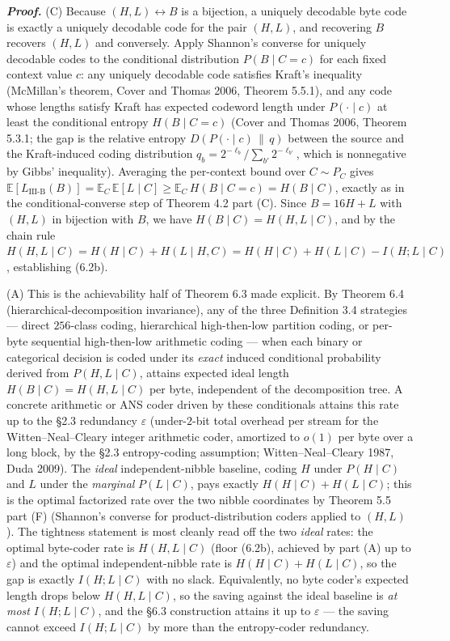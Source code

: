 \documentclass[
]{article}
\begin{document}
\emph{\textbf{Proof.}} (C) Because $(H, L) \leftrightarrow B$ is a
bijection, a uniquely decodable byte code is exactly a uniquely
decodable code for the pair $(H, L)$, and recovering $B$ recovers
$(H, L)$ and conversely. Apply Shannon's converse for uniquely
decodable codes to the conditional distribution $P(B \mid C = c)$ for
each fixed context value $c$: any uniquely decodable code satisfies
Kraft's inequality (McMillan's theorem, Cover and Thomas 2006,
Theorem 5.5.1), and any code whose lengths satisfy Kraft has expected
codeword length under $P(\cdot \mid c)$ at least the conditional
entropy $H(B \mid C = c)$ (Cover and Thomas 2006, Theorem 5.3.1; the
gap is the relative entropy $D(P(\cdot \mid c) \,\|\, q)$ between the
source and the Kraft-induced coding distribution
$q_b = 2^{-\ell_b} / \sum_{b'} 2^{-\ell_{b'}}$, which is nonnegative
by Gibbs' inequality). Averaging the per-context bound
over $C \sim P_C$ gives
$\mathbb{E}[L_{\mathrm{III\text{-}B}}(B)] = \mathbb{E}_C
\,\mathbb{E}[L \mid C] \geq \mathbb{E}_C\, H(B \mid C = c) = H(B \mid C)$,
exactly as in the conditional-converse step of Theorem 4.2 part (C).
Since $B = 16H + L$ with $(H, L)$ in bijection with $B$, we have
$H(B \mid C) = H(H, L \mid C)$, and by the chain rule
$H(H, L \mid C) = H(H \mid C) + H(L \mid H, C)
= H(H \mid C) + H(L \mid C) - I(H ; L \mid C)$, establishing (6.2b).

(A) This is the achievability half of Theorem 6.3 made explicit. By
Theorem 6.4 (hierarchical-decomposition invariance), any of the three
Definition 3.4 strategies --- direct $256$-class coding, hierarchical
high-then-low partition coding, or per-byte sequential high-then-low
arithmetic coding --- when each binary or categorical decision is
coded under its \emph{exact} induced conditional probability derived
from $P(H, L \mid C)$, attains expected ideal length
$H(B \mid C) = H(H, L \mid C)$ per byte, independent of the
decomposition tree. A concrete arithmetic or ANS coder driven by
these conditionals attains this rate up to the §2.3 redundancy
$\varepsilon$ (under-$2$-bit total overhead per stream for the
Witten--Neal--Cleary integer arithmetic coder, amortized to $o(1)$
per byte over a long block, by the §2.3 entropy-coding assumption;
Witten--Neal--Cleary 1987, Duda 2009). The \emph{ideal} independent-nibble
baseline, coding $H$ under $P(H \mid C)$ and $L$ under the
\emph{marginal} $P(L \mid C)$, pays exactly $H(H \mid C) + H(L \mid C)$;
this is the optimal factorized rate over the two nibble coordinates by
Theorem 5.5 part (F) (Shannon's converse for product-distribution
coders applied to $(H, L)$). The tightness statement is most cleanly
read off the two \emph{ideal} rates: the optimal byte-coder rate is
$H(H, L \mid C)$ (floor (6.2b), achieved by part (A) up to
$\varepsilon$) and the optimal independent-nibble rate is
$H(H \mid C) + H(L \mid C)$, so the gap is exactly $I(H ; L \mid C)$
with no slack. Equivalently, no byte coder's expected length drops
below $H(H, L \mid C)$, so the saving against the ideal baseline is
\emph{at most} $I(H ; L \mid C)$, and the §6.3 construction attains it
up to $\varepsilon$ --- the saving cannot exceed $I(H ; L \mid C)$ by
more than the entropy-coder redundancy.
\end{document}
